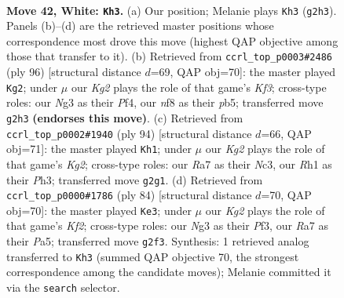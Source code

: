 \documentclass[11pt]{article}
\begin{document}
\clearpage

\begin{figure}[p]\centering
\begin{subfigure}{0.46\textwidth}\centering
\resizebox{\linewidth}{!}{%
\newchessgame
\chessboard[
  setfen={5n1k/RpQ4p/7p/1r6/8/6N1/3q2K1/7R w - - 1 42},
  showmover=false,
  pgfstyle=straightmove, color=movearrow, markmove={g2-h3}
]}
\caption{}
\end{subfigure}\hfill
\begin{subfigure}{0.46\textwidth}\centering
\resizebox{\linewidth}{!}{%
\newchessgame
\chessboard[
  setfen={7k/4P1p1/8/1p1Q4/p4P1r/2q2KR1/8/8 w - - 1 49},
  showmover=false,
  pgfstyle=straightmove, color=movearrow, markmove={f3-g2}
]}
\caption{}
\end{subfigure}
\\[4pt]
\begin{subfigure}{0.46\textwidth}\centering
\resizebox{\linewidth}{!}{%
\newchessgame
\chessboard[
  setfen={8/5k1p/2Q3p1/1p2p1q1/8/2N4P/6K1/8 w - - 5 48},
  showmover=false,
  pgfstyle=straightmove, color=movearrow, markmove={g2-h1}
]}
\caption{}
\end{subfigure}\hfill
\begin{subfigure}{0.46\textwidth}\centering
\resizebox{\linewidth}{!}{%
\newchessgame
\chessboard[
  setfen={8/6pk/p5p1/Pp5n/1Q4R1/5P2/2q2K2/8 w - - 5 43},
  showmover=false,
  pgfstyle=straightmove, color=movearrow, markmove={f2-e3}
]}
\caption{}
\end{subfigure}
\caption{\textbf{Move 42, White: \texttt{Kh3}.} (a) Our position; Melanie plays \texttt{Kh3} (\texttt{g2h3}). Panels (b)--(d) are the retrieved master positions whose correspondence most drove this move (highest QAP objective among those that transfer to it). (b) Retrieved from \texttt{ccrl\_top\_p0003\#2486} (ply 96) [structural distance $d$=69, QAP obj=70]: the master played \texttt{Kg2}; under $\mu$ our \emph{Kg2} plays the role of that game's \emph{Kf3}; cross-type roles: our \emph{N}g3 as their \emph{P}f4, our \emph{n}f8 as their \emph{p}b5; transferred move \texttt{g2h3} \textbf{(endorses this move)}. (c) Retrieved from \texttt{ccrl\_top\_p0002\#1940} (ply 94) [structural distance $d$=66, QAP obj=71]: the master played \texttt{Kh1}; under $\mu$ our \emph{Kg2} plays the role of that game's \emph{Kg2}; cross-type roles: our \emph{R}a7 as their \emph{N}c3, our \emph{R}h1 as their \emph{P}h3; transferred move \texttt{g2g1}. (d) Retrieved from \texttt{ccrl\_top\_p0000\#1786} (ply 84) [structural distance $d$=70, QAP obj=70]: the master played \texttt{Ke3}; under $\mu$ our \emph{Kg2} plays the role of that game's \emph{Kf2}; cross-type roles: our \emph{N}g3 as their \emph{P}f3, our \emph{R}a7 as their \emph{P}a5; transferred move \texttt{g2f3}. Synthesis: 1 retrieved analog transferred to \texttt{Kh3} (summed QAP objective 70, the strongest correspondence among the candidate moves); Melanie committed it via the \texttt{search} selector.}
\label{fig:thought-m82}
\end{figure}
\end{document}
